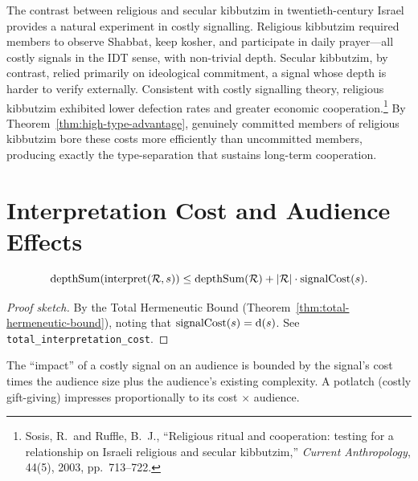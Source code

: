 \begin{example}
The contrast between religious and secular kibbutzim in
twentieth-century Israel provides a natural experiment in costly
signalling.  Religious kibbutzim required members to observe Shabbat,
keep kosher, and participate in daily prayer---all costly signals in
the IDT sense, with non-trivial depth.  Secular kibbutzim, by
contrast, relied primarily on ideological commitment, a signal whose
depth is harder to verify externally.  Consistent with costly
signalling theory, religious kibbutzim exhibited lower defection rates
and greater economic cooperation.\footnote{Sosis, R.\ and Ruffle,
  B.~J., ``Religious ritual and cooperation: testing for a
  relationship on Israeli religious and secular kibbutzim,''
  \textit{Current Anthropology}, 44(5), 2003, pp.~713--722.}
By Theorem~\ref{thm:high-type-advantage}, genuinely committed members
of religious kibbutzim bore these costs more efficiently than
uncommitted members, producing exactly the type-separation that
sustains long-term cooperation.
\end{example}

\section{Interpretation Cost and Audience Effects}
\label{sec:ch3:interp-cost}

\begin{theorem}
\label{thm:total-interp-cost}
\[
  \operatorname{depthSum}(\operatorname{interpret}(\mathcal{R}, s))
  \leq \operatorname{depthSum}(\mathcal{R}) + |\mathcal{R}| \cdot \operatorname{signalCost}(s).
\]
\end{theorem}

\begin{proof}[Proof sketch]
By the Total Hermeneutic Bound (Theorem~\ref{thm:total-hermeneutic-bound}),
noting that $\operatorname{signalCost}(s) = \operatorname{d}(s)$.
See \texttt{total\_interpretation\_cost}.
\end{proof}

\begin{remark}
The ``impact'' of a costly signal on an audience is bounded by the
signal's cost times the audience size plus the audience's existing
complexity.  A potlatch (costly gift-giving) impresses proportionally to
its cost $\times$ audience.
\end{remark}

